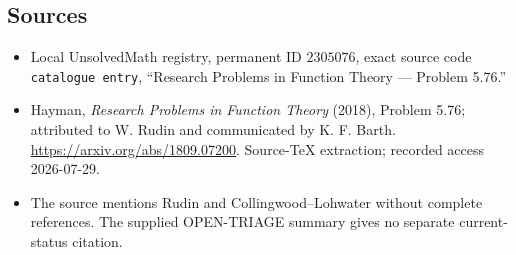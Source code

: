 \documentclass[11pt]{article}
\begin{document}
\subsection{Sources}
\begin{itemize}
\item Local UnsolvedMath registry, permanent ID \(2305076\), exact source code \texttt{catalogue entry}, ``Research Problems in Function Theory --- Problem 5.76.''
\item Hayman, \emph{Research Problems in Function Theory} (2018), Problem 5.76; attributed to W. Rudin and communicated by K. F. Barth. \url{https://arxiv.org/abs/1809.07200}. Source-TeX extraction; recorded access 2026-07-29.
\item The source mentions Rudin and Collingwood--Lohwater without complete references. The supplied OPEN-TRIAGE summary gives no separate current-status citation.
\end{itemize}
\end{document}
